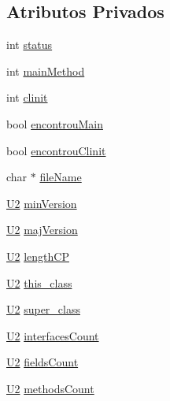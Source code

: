 \subsection*{Atributos Privados}
\begin{DoxyCompactItemize}
\item 
int \hyperlink{classLeitorExibidor_ac54b88860544d66f5e8f620c4c017a37}{status}
\item 
int \hyperlink{classLeitorExibidor_a9e7a108ebca3fac0096fcb422f2393db}{main\+Method}
\item 
int \hyperlink{classLeitorExibidor_a0c4c896a1baf647a282881524f8a9687}{clinit}
\item 
bool \hyperlink{classLeitorExibidor_aca32f682d0ccd1d60a76d0833ca0617f}{encontrou\+Main}
\item 
bool \hyperlink{classLeitorExibidor_a93a1aa14204f0445a97304cc504a3cf0}{encontrou\+Clinit}
\item 
char $\ast$ \hyperlink{classLeitorExibidor_a1dfa84388856ad4d83883e4e5548b485}{file\+Name}
\item 
\hyperlink{BasicTypes_8h_a90240657108b1b457eef9d3f76e0202e}{U2} \hyperlink{classLeitorExibidor_a6f6ac6ed85979359308c07c666316218}{min\+Version}
\item 
\hyperlink{BasicTypes_8h_a90240657108b1b457eef9d3f76e0202e}{U2} \hyperlink{classLeitorExibidor_a5c2cd58569e9c3fdc47c0bbab116b870}{maj\+Version}
\item 
\hyperlink{BasicTypes_8h_a90240657108b1b457eef9d3f76e0202e}{U2} \hyperlink{classLeitorExibidor_ae891dce6b86c2d09c1a112bd585561d6}{length\+CP}
\item 
\hyperlink{BasicTypes_8h_a90240657108b1b457eef9d3f76e0202e}{U2} \hyperlink{classLeitorExibidor_ad85a876f6368ae8101343f4f35b53019}{this\+\_\+class}
\item 
\hyperlink{BasicTypes_8h_a90240657108b1b457eef9d3f76e0202e}{U2} \hyperlink{classLeitorExibidor_adc9f3b119883f9bc4ba0323b8480c53e}{super\+\_\+class}
\item 
\hyperlink{BasicTypes_8h_a90240657108b1b457eef9d3f76e0202e}{U2} \hyperlink{classLeitorExibidor_a596a1440982d2418e39adf5b1857ab15}{interfaces\+Count}
\item 
\hyperlink{BasicTypes_8h_a90240657108b1b457eef9d3f76e0202e}{U2} \hyperlink{classLeitorExibidor_a9a54627d53b9a3c25c5ba71977e1e002}{fields\+Count}
\item 
\hyperlink{BasicTypes_8h_a90240657108b1b457eef9d3f76e0202e}{U2} \hyperlink{classLeitorExibidor_a3f5d59fb172e478ab6d1a595a8b6c54a}{methods\+Count}
\item 

\end{DoxyCompactItemize}
